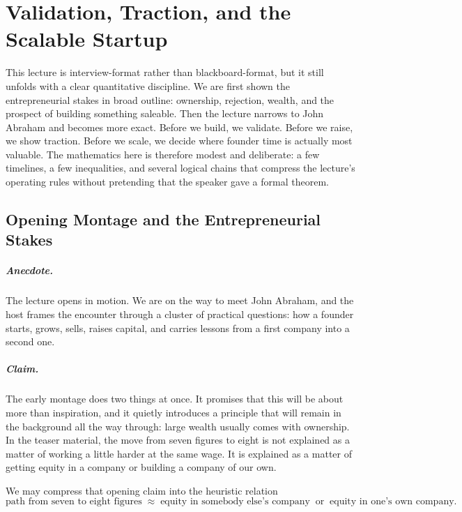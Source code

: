 \chapter{Validation, Traction, and the Scalable Startup}

This lecture is interview-format rather than blackboard-format, but it still unfolds with a clear quantitative discipline. We are first shown the entrepreneurial stakes in broad outline: ownership, rejection, wealth, and the prospect of building something saleable. Then the lecture narrows to John Abraham and becomes more exact. Before we build, we validate. Before we raise, we show traction. Before we scale, we decide where founder time is actually most valuable. The mathematics here is therefore modest and deliberate: a few timelines, a few inequalities, and several logical chains that compress the lecture's operating rules without pretending that the speaker gave a formal theorem.

\section{Opening Montage and the Entrepreneurial Stakes}

\paragraph{Anecdote.} The lecture opens in motion. We are on the way to meet John Abraham, and the host frames the encounter through a cluster of practical questions: how a founder starts, grows, sells, raises capital, and carries lessons from a first company into a second one.

\paragraph{Claim.} The early montage does two things at once. It promises that this will be about more than inspiration, and it quietly introduces a principle that will remain in the background all the way through: large wealth usually comes with ownership. In the teaser material, the move from seven figures to eight is not explained as a matter of working a little harder at the same wage. It is explained as a matter of getting equity in a company or building a company of our own.

We may compress that opening claim into the heuristic relation
\begin{equation}
\text{path from seven to eight figures}
\;\approx\;
\text{equity in somebody else's company}
\;\;\text{or}\;\;
\text{equity in one's own company}.
\end{equation}

